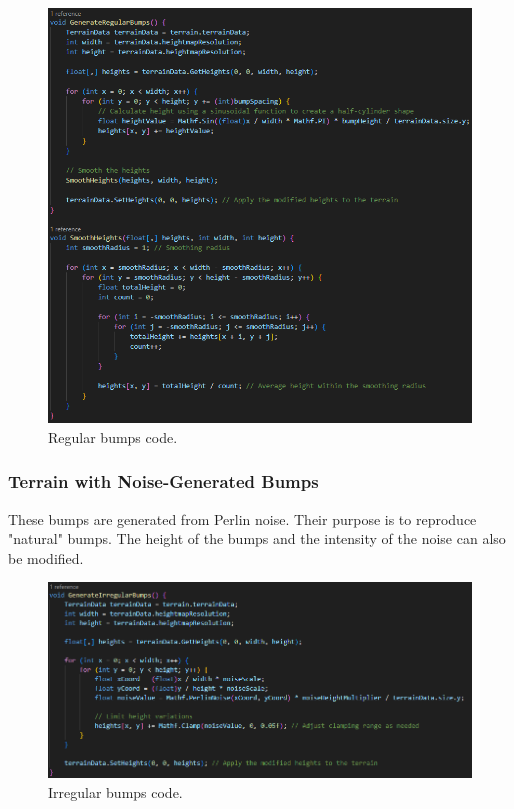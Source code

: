 \documentclass[american]{acmtog} %
\begin{document}
\begin{figure}[H]
\centerline{\includegraphics[width=\columnwidth]{figures/regular_bumps_code.png}}
\caption{Regular bumps code.}
    \label{fig:regular_bumps_code}
\end{figure}

\subsubsection{Terrain with Noise-Generated Bumps}
These bumps are generated from Perlin noise. Their purpose is to reproduce "natural" bumps. The height of the bumps and the intensity of the noise can also be modified.

\begin{figure}[H]
\centerline{\includegraphics[width=\columnwidth]{figures/irregular_bumps_code.png}}
\caption{Irregular bumps code.}
    \label{fig:irregular_bumps_code}
\end{figure}
\end{document}
